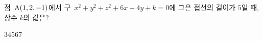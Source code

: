 점~$\mathrm{A}(1{,}\mkern3mu\mathopen{}2{,}\mkern3mu\mathopen{}-1)$에서 구~$x^2+y^2+z^2+6x+4y+k=0$에 그은 접선의 길이가 $5$일 때, 상수 $k$의 값은?
\begin{choices32}{$3$}{$4$}{$5$}{$6$}{$7$}\end{choices32}
